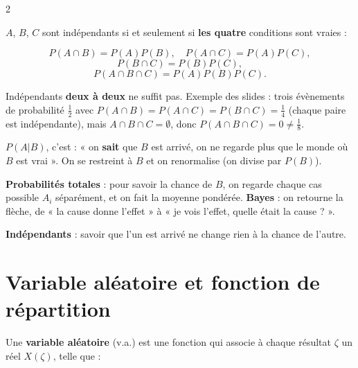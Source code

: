 \documentclass[a4paper,9pt]{extarticle}
\begin{document}
\begin{multicols}{2}
\begin{definition}
\vspace{3pt}

$A$, $B$, $C$ sont indépendants si et seulement si \textbf{les quatre} conditions sont
vraies :

\[
P(A \cap B) = P(A)P(B), \quad P(A\cap C) = P(A)P(C),
\]
\[
P(B\cap C) = P(B)P(C),
\]
\[
P(A\cap B\cap C) = P(A)P(B)P(C).
\]

\end{definition}


\begin{warning}

Indépendants \textbf{deux à deux} ne suffit pas. Exemple des slides : trois évènements de
probabilité $\frac12$ avec $P(A\cap B) = P(A\cap C) = P(B\cap C) = \frac14$ (chaque paire est
indépendante), mais $A\cap B\cap C = \emptyset$, donc $P(A\cap B\cap C) = 0 \ne \frac18$.

\end{warning}


\begin{simple}

$P(A|B)$, c'est : « on \textbf{sait} que $B$ est arrivé, on ne regarde plus que le monde où $B$
est vrai ». On se restreint à $B$ et on renormalise (on divise par $P(B)$).

\vspace{3pt}

\textbf{Probabilités totales} : pour savoir la chance de $B$, on regarde chaque cas possible
$A_i$ séparément, et on fait la moyenne pondérée. \textbf{Bayes} : on retourne la flèche, de
« la cause donne l'effet » à « je vois l'effet, quelle était la cause ? ».

\vspace{3pt}

\textbf{Indépendants} : savoir que l'un est arrivé ne change rien à la chance de l'autre.

\end{simple}


\section{Variable aléatoire et fonction de répartition}


\begin{definition}

Une \textbf{variable aléatoire} (v.a.) est une fonction qui associe à chaque résultat $\zeta$
un réel $X(\zeta)$, telle que :


\end{definition}
\end{multicols}
\end{document}
